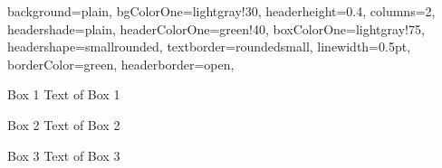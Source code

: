 \documentclass[portrait,fontscale=0.7,margin=0.7cm,paperwidth=15truecm, paperheight=9truecm,debug]{baposter}
\begin{document}
\begin{poster}{
  background=plain,
  bgColorOne=lightgray!30,
  headerheight=0.4\textheight,
  columns=2,
  headershade=plain,
  headerColorOne=green!40,
  boxColorOne=lightgray!75,
  headershape=smallrounded,
  textborder=roundedsmall,
  linewidth=0.5pt,
  borderColor=green,
  headerborder=open,
}{}{}{}{}

\begin{posterbox}[column=0]{Box 1}
Text of Box 1
\end{posterbox}

\begin{posterbox}[column=0,below=auto,height=bottom]{Box 2}
Text of Box 2
\end{posterbox}

\begin{posterbox}[column=1,height=bottom]{Box 3}
Text of Box 3
\end{posterbox}

\end{poster}
\end{document}
